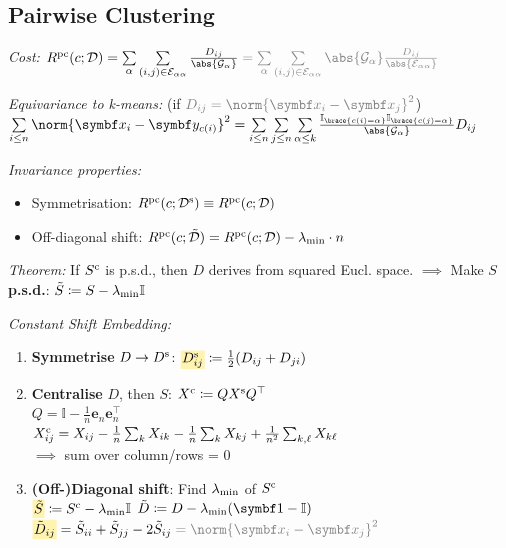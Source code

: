 \subsection{Pairwise Clustering}

\emph{Cost:}\enspace
$R\ap{pc} (c; \mathcal D)
= \sum\limits_\alpha \sum\limits_{(i,j) \in \mathcal E_{\alpha\alpha}} \frac{D_{ij}}{\abs{\mathcal G_\alpha}}
\color{gray}
= \sum\limits_\alpha \sum\limits_{(i,j) \in \mathcal E_{\alpha\alpha}} \abs{\mathcal G_\alpha} \frac{D_{ij}}{\abs{\mathcal E_{\alpha\alpha}}}$

\emph{Equivariance to \textit{\rmfamily k}-means:}
{\small\color{gray}\quad(if $\color{gray} D_{ij} = \norm{\symbf x_i - \symbf x_j}^2$)}\\
$\sum\limits_{i\leq n} \norm{\symbf x_i - \symbf y_{c(i)}}^2 = \sum\limits_{i\leq n} \sum\limits_{j\leq n} \sum\limits_{\alpha\leq k} \frac{\mathbb I_{\brace{c(i) = \alpha}} \mathbb I_{\brace{c(j) = \alpha}}}{\abs{\mathcal G_\alpha}} D_{ij}$


\emph{Invariance properties:}\\
\begin{itemize}
    \item Symmetrisation:
        \enskip $R^\mathrm{pc} (c; \mathcal D^\mathrm{s}) \equiv R^\mathrm{pc} (c; \mathcal D)$
    \item Off-diagonal shift:
        \enskip $R^\mathrm{pc} (c; \tilde{\mathcal D}) = R^\mathrm{pc} (c; \mathcal D) - \lambda_\mathrm{min}\cdot n$
\end{itemize}

\emph{Theorem:}\enspace
If $S^\mathrm{c}$ is p.s.d., then $D$ derives from squared Eucl. space.
$\implies$ Make $S$ \textbf{p.s.d.}: \enskip $\tilde S \coloneqq S - \lambda_\mathrm{min} \mathbb I$

\emph{Constant Shift Embedding:}\\
\begin{enumerate}
    \item \textbf{Symmetrise} $D \to D^\mathrm{s}$:
        \enskip $\highlight*{D_{ij}\ap{s}} \coloneqq \frac12 (D_{ij} + D_{ji})$
    \item \textbf{Centralise} $D$, then $S$:
        \enskip $X^\mathrm{c} \coloneqq Q X^\mathrm{s} Q^\top$\\
        $Q = \mathbb I - \frac1n \symbf e_n \symbf e_n^\top$
        \qquad {}\\
        $X^\mathrm{c}_{ij} = X_{ij} - \frac1n \sum_k X_{ik} - \frac1n \sum_k X_{kj} + \frac{1}{n^2} \sum_{k,\ell} X_{k\ell}$\\
        $\implies$ sum over column/rows = 0
    \item \textbf{(Off-)Diagonal shift}:
        \enskip Find $\lambda_\mathrm{min}$ of $S^\mathrm{c}$\\
        $\highlight*{\tilde S} \coloneqq S\ap{c} - \lambda\ped{min} \mathbb I$
        \qquad $\tilde D \coloneqq D - \lambda\ped{min} (\symbf 1 - \mathbb I)$\\
        $\highlight*{\tilde D_{ij}} = \tilde S_{ii} + \tilde S_{jj} - 2 \tilde S_{ij} \color{gray} = \norm{\symbf x_i - \symbf x_j}^2$
\end{enumerate}


